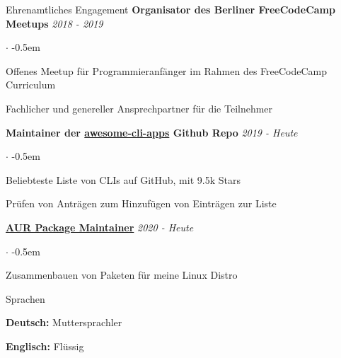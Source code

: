 \documentclass{cv}
\begin{document}
\begin{rSection}{Ehrenamtliches Engagement}
  {\bf Organisator des Berliner FreeCodeCamp Meetups}
  \hfill
  {\em 2018 - 2019}

  \begin{list}{$\cdot$}{}
    \itemsep -0.5em \vspace{-0.5em}
    \smallskip
    \item Offenes Meetup für Programmieranfänger im Rahmen des FreeCodeCamp Curriculum
    \item Fachlicher und genereller Ansprechpartner für die Teilnehmer
  \end{list}

  {\bf Maintainer der \href{https://github.com/agarrharr/awesome-cli-apps}{awesome-cli-apps} Github Repo}
  \hfill
  {\em 2019 - Heute}

  \begin{list}{$\cdot$}{}
    \itemsep -0.5em \vspace{-0.5em}
    \smallskip
    \item Beliebteste Liste von CLIs auf GitHub, mit 9.5k Stars
    \item Prüfen von Anträgen zum Hinzufügen von Einträgen zur Liste
  \end{list}

  {\bf \href{https://aur.archlinux.org/packages/?SeB=m&K=jneidel}{AUR Package Maintainer}}
  \hfill
  {\em 2020 - Heute}

  \begin{list}{$\cdot$}{}
    \itemsep -0.5em \vspace{-0.5em}
    \smallskip
    \item Zusammenbauen von Paketen für meine Linux Distro
  \end{list}
\end{rSection}

\begin{rSection}{Sprachen}
  \begin{minipage}[l]{0.48\linewidth}
  {\bf Deutsch:} Muttersprachler
  \end{minipage}
  \begin{minipage}[l]{0.48\linewidth}
  {\bf Englisch:} Flüssig \hfill
  \end{minipage}
\end{rSection}
\end{document}
